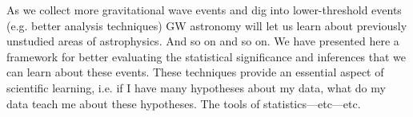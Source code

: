 As we collect more gravitational wave events and dig into lower-threshold events (e.g. better analysis techniques) GW astronomy will let us learn about previously unstudied areas of astrophysics. And so on and so on. We have presented here a framework for better evaluating the statistical significance and inferences that we can learn about these events. These techniques provide an essential aspect of scientific learning, i.e. if I have many hypotheses about my data, what do my data teach me about these hypotheses. The tools of statistics---etc---etc.
